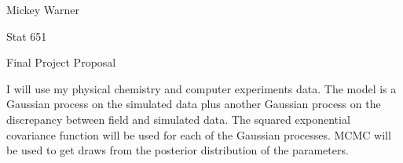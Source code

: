 \documentclass[12pt]{article}
\begin{document}
\noindent Mickey Warner

\noindent Stat 651

\begin{center} Final Project Proposal \end{center}

\noindent I will use my physical chemistry and computer experiments data. The model is a Gaussian process on the simulated data plus another Gaussian process on the discrepancy between field and simulated data. The squared exponential covariance function will be used for each of the Gaussian processes. MCMC will be used to get draws from the posterior distribution of the parameters.
\end{document}
